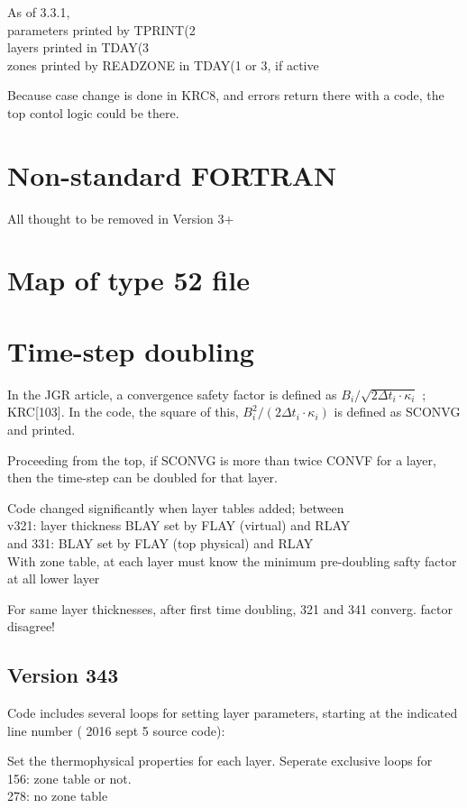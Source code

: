 \documentclass{article}
\newcommand{\qi}{\\ \hspace*{2.em}}      %
\begin{document}
As of 3.3.1, 
\qi parameters printed by TPRINT(2
\qi layers printed in TDAY(3
\qi zones printed by READZONE in TDAY(1 or 3, if active

Because case change is done in KRC8, and errors return there with a code,
 the top contol logic could be there.  

\section{Non-standard FORTRAN}
All thought to be removed in Version 3+

\appendix %

\section{Map of type 52 file \label{type52}}


\section{Time-step doubling}
In the JGR article, a convergence safety factor is defined as $ B_i / \sqrt{ 2
  \Delta t_i \cdot \kappa_i}$ ; KRC[103]. In the code, the square of this, 
 $B_i^2 / (2 \Delta t_i \cdot \kappa_i)$ is defined as SCONVG and printed.

Proceeding from the top, if SCONVG is more than twice CONVF for a layer, then
the time-step can be doubled for that layer.

Code changed significantly when layer tables added; between 
\qi v321: layer thickness BLAY set by FLAY (virtual) and RLAY 
\qi and 331: BLAY set by FLAY (top physical) and RLAY
\\ With zone table, at each layer must know the minimum pre-doubling safty factor at all lower layer

For same layer thicknesses, after first time doubling, 321 and 341
converg. factor disagree!

\subsection {Version 343}

Code includes several loops for setting layer parameters, starting at the
indicated line number ( 2016 sept 5 source code):

Set the thermophysical properties for each layer. Seperate exclusive loops for
\qi  156:  zone table or not.
\qi  278: no zone table
\end{document}
